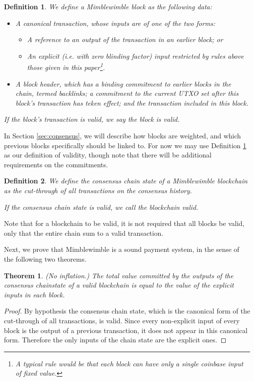 \documentclass[letterpaper]{article}
\newtheorem{thrm}{Theorem}
\newtheorem{defn}{Definition}
\begin{document}
\begin{defn} We define a \emph{Mimblewimble block} as the following data:
\begin{itemize}
\item A canonical transaction, whose inputs are of one of the two forms:
\begin{itemize}
\item A reference to an output of the transaction in an earlier block; or
\item An explicit (\emph{i.e.} with zero blinding factor) input restricted
by rules above those given in this paper\footnote{A typical rule would be
that each block can have only a single \emph{coinbase input} of fixed
value.}.
\end{itemize}
\item A \emph{block header}, which has a binding commitment to earlier
blocks in the chain, termed \emph{backlinks}; a commitment to the current
UTXO set after this block's transaction has teken effect; and the transaction
included in this block.
\end{itemize}
If the block's transaction is valid, we say the block is \emph{valid}.
\label{defn:blockvalid}
\end{defn}

In Section \ref{sec:consensus}, we will describe how blocks are weighted,
and which previous blocks specifically should be linked to. For now we may
use Definition \ref{defn:blockvalid} as our definition of validity, though
note that there will be additional requirements on the commitments.

\begin{defn} We define the \emph{consensus chain state} of a Mimblewimble
blockchain as the cut-through of all transactions on the consensus history.

If the consensus chain state is valid, we call the blockchain \emph{valid}.
\end{defn}
Note that for a blockchain to be valid, it is not required that all blocks
be valid, only that the entire chain sum to a valid transaction.

Next, we prove that Mimblewimble is a sound payment system, in the sense
of the following two theorems.
\begin{thrm} (No inflation.) The total value committed by the outputs of
the consensus chainstate of a valid blockchain is equal to the value of
the explicit inputs in each block.
\end{thrm}
\begin{proof} By hypothesis the consensus chain state, which is the canonical
form of the cut-through of all transactions, is valid. Since every non-explicit
input of every block is the output of a previous transaction, it does not appear
in this canonical form. Therefore the only inputs of the chain state are the
explicit ones.
\end{proof}
\end{document}
